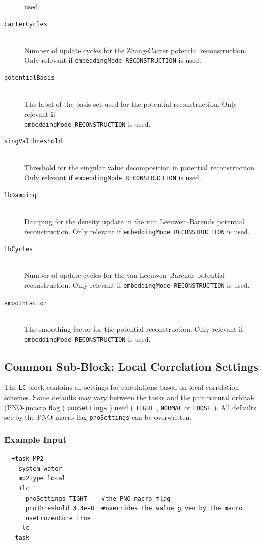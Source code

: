 \documentclass[bibliography=totocnumbered,a4paper,10pt,oneside]{scrbook}
\newcommand{\ttt}[1]{%
  \begingroup\setlength{\fboxsep}{1pt}%
  \colorbox{serenity-green!30}{\texttt{\hspace*{2pt}\vphantom{(g}#1\hspace*{2pt}}}%
  \endgroup
}
\begin{document}
\begin{description}
    used.
  \item [\texttt{carterCycles}]\hfill \\
    Number of update cycles for the Zhang-Carter potential reconstruction. Only relevant if
    \ttt{embeddingMode RECONSTRUCTION} is used.
  \item [\texttt{potentialBasis}]\hfill \\
    The label of the basis set used for the potential reconstruction. Only relevant if\\
    \ttt{embeddingMode RECONSTRUCTION} is used.
  \item [\texttt{singValThreshold}]\hfill \\
    Threshold for the singular value decomposition in potential reconstruction. Only relevant if
    \ttt{embeddingMode RECONSTRUCTION} is used.
  \item [\texttt{lbDamping}]\hfill \\
    Damping for the density update in the van Leeuwen--Barends potential reconstruction. Only relevant if
    \ttt{embeddingMode RECONSTRUCTION} is used.
  \item [\texttt{lbCycles}]\hfill \\
    Number of update cycles for the van Leeuwen--Barends potential reconstruction. Only relevant if
    \ttt{embeddingMode RECONSTRUCTION} is used.
  \item [\texttt{smoothFactor}]\hfill \\
    The smoothing factor for the potential reconstruction. Only relevant if\\
    \ttt{embeddingMode RECONSTRUCTION} is used.
\end{description}

\subsection{Common Sub-Block: Local Correlation Settings}
The \texttt{LC} block contains all settings for calculations based on local-correlation schemes.
Some defaults may vary between the tasks and the pair natural orbital-(PNO-)macro flag
(\ttt{pnoSettings}) used (\ttt{TIGHT}, \ttt{NORMAL} or \ttt{LOOSE}).
All defaults set by the PNO-macro flag \ttt{pnoSettings} can be overwritten.

\subsubsection{Example Input}
\begin{lstlisting}
  +task MP2
    system water  
    mp2Type local
    +lc 
      pnoSettings TIGHT    #the PNO-macro flag
      pnoThreshold 3.3e-8  #overrides the value given by the macro
      useFrozenCore true
    -lc 
  -task
 \end{lstlisting}
\end{document}
